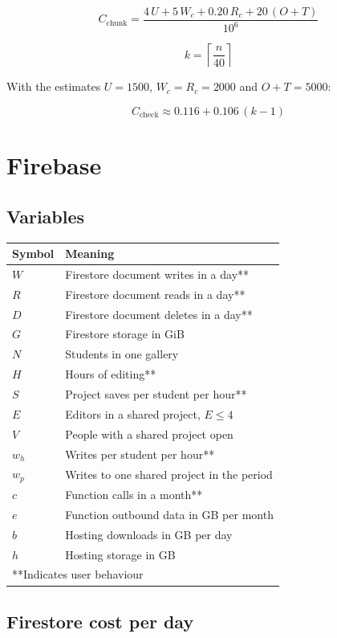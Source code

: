 \documentclass{article}
\begin{document}
\[
C_{\text{chunk}} =
\frac{4\,U + 5\,W_c + 0.20\,R_c + 20\,(O + T)}{10^{6}}
\]

\[
k = \left\lceil \frac{n}{40} \right\rceil
\]

With the estimates $U = 1500$, $W_c = R_c = 2000$ and $O + T = 5000$:

\[
C_{\text{check}} \approx 0.116 + 0.106\,(k - 1)
\]

\section{Firebase}

\subsection{Variables}

\begin{center}
\begin{tabular}{ll}
\toprule
Symbol & Meaning \\
\midrule
$W$ & Firestore document writes in a day** \\
$R$ & Firestore document reads in a day** \\
$D$ & Firestore document deletes in a day** \\
$G$ & Firestore storage in GiB \\
$N$ & Students in one gallery \\
$H$ & Hours of editing** \\
$S$ & Project saves per student per hour** \\
$E$ & Editors in a shared project, $E \le 4$ \\
$V$ & People with a shared project open \\
$w_h$ & Writes per student per hour** \\
$w_p$ & Writes to one shared project in the period \\
$c$ & Function calls in a month** \\
$e$ & Function outbound data in GB per month \\
$b$ & Hosting downloads in GB per day \\
$h$ & Hosting storage in GB \\
\multicolumn{2}{l}{**Indicates user behaviour} \\
\bottomrule
\end{tabular}
\end{center}

\subsection{Firestore cost per day}
\end{document}
